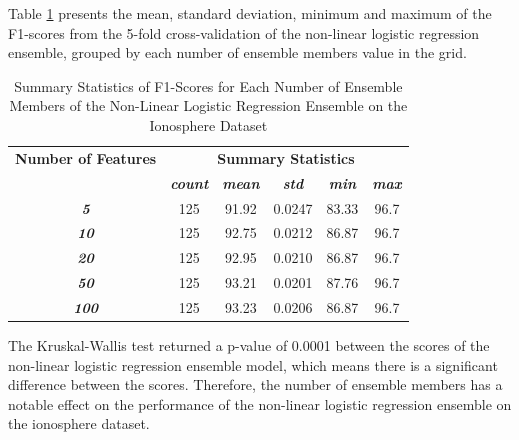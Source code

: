 \documentclass[10pt, conference]{IEEEtran}
\begin{document}
Table \ref{table: I_member_nonlinear_performance_metrics} presents the mean, standard deviation, minimum and maximum of the
F1-scores from the 5-fold cross-validation of the non-linear logistic regression ensemble, grouped by each number of ensemble members
value in the grid.
\begin{table}[H]
    \caption{Summary Statistics of F1-Scores for Each Number of Ensemble Members of the Non-Linear Logistic Regression Ensemble on the Ionosphere Dataset}
    \begin{center}
        \begin{tabular}{|c||c|c|c|c|c|}
            \hline
            \textbf{Number of Features}&\multicolumn{5}{|c|}{\textbf{Summary Statistics}} \\
            \cline{2-6}
                                &\textbf{\textit{count}} & \textbf{\textit{mean}} & \textbf{\textit{std}} & \textbf{\textit{min}} & \textbf{\textit{max}}\\
            \hline
            \textbf{\textit{5}}   & 125 & 91.92 & 0.0247 & 83.33 & 96.7 \\
            \textbf{\textit{10}}  & 125 & 92.75 & 0.0212 & 86.87 & 96.7 \\
            \textbf{\textit{20}}  & 125 & 92.95 & 0.0210 & 86.87 & 96.7 \\
            \textbf{\textit{50}}  & 125 & 93.21 & 0.0201 & 87.76 & 96.7 \\
            \textbf{\textit{100}} & 125 & 93.23 & 0.0206 & 86.87 & 96.7 \\
            \hline
        \end{tabular}
    \end{center}
    \label{table: I_member_nonlinear_performance_metrics}
\end{table}
The Kruskal-Wallis test returned a p-value of 0.0001 between the scores of the non-linear logistic regression ensemble model,
which means there is a significant difference between the scores. Therefore, the number of ensemble members
has a notable effect on the performance of the non-linear logistic regression ensemble on the ionosphere dataset.
\end{document}
